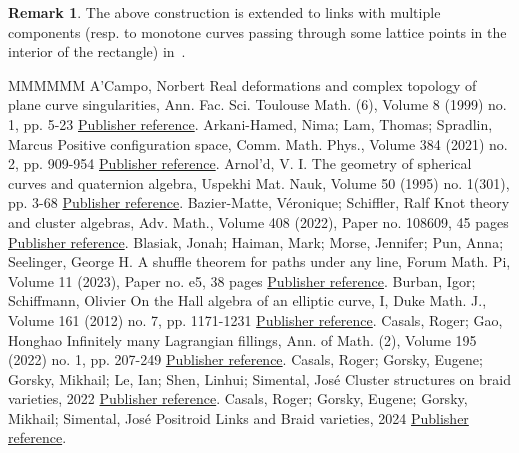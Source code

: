 \documentclass[11pt]{article}
\theoremstyle{definition}
\newtheorem{remark}[theo]{Remark}
\numberwithin{equation}{section}
\begin{document}
\begin{remark}
The above construction is extended to links with multiple components (resp. to monotone curves passing through some lattice points in the interior of the rectangle) in~\cite[Section~7.3]{GL_EHA}.
\end{remark} 


\begin{thebibliography}{MMMMMM}
 A’Campo, Norbert Real deformations and complex topology of plane curve singularities, Ann. Fac. Sci. Toulouse Math. (6), Volume 8 (1999) no. 1, pp. 5-23 \href{https://alco.centre-mersenne.org/articles/10.5802/alco.345/#ACampo}{Publisher reference}.
 Arkani-Hamed, Nima; Lam, Thomas; Spradlin, Marcus Positive configuration space, Comm. Math. Phys., Volume 384 (2021) no. 2, pp. 909-954 \href{https://alco.centre-mersenne.org/articles/10.5802/alco.345/#ALS}{Publisher reference}.
 Arnol’d, V. I. The geometry of spherical curves and quaternion algebra, Uspekhi Mat. Nauk, Volume 50 (1995) no. 1(301), pp. 3-68 \href{https://alco.centre-mersenne.org/articles/10.5802/alco.345/#Arnold}{Publisher reference}.
 Bazier-Matte, Véronique; Schiffler, Ralf Knot theory and cluster algebras, Adv. Math., Volume 408 (2022), Paper no. 108609, 45 pages \href{https://alco.centre-mersenne.org/articles/10.5802/alco.345/#BMS}{Publisher reference}.
 Blasiak, Jonah; Haiman, Mark; Morse, Jennifer; Pun, Anna; Seelinger, George H. A shuffle theorem for paths under any line, Forum Math. Pi, Volume 11 (2023), Paper no. e5, 38 pages \href{https://alco.centre-mersenne.org/articles/10.5802/alco.345/#BHMPS}{Publisher reference}.
 Burban, Igor; Schiffmann, Olivier On the Hall algebra of an elliptic curve, I, Duke Math. J., Volume 161 (2012) no. 7, pp. 1171-1231 \href{https://alco.centre-mersenne.org/articles/10.5802/alco.345/#BuSc}{Publisher reference}.
 Casals, Roger; Gao, Honghao Infinitely many Lagrangian fillings, Ann. of Math. (2), Volume 195 (2022) no. 1, pp. 207-249 \href{https://alco.centre-mersenne.org/articles/10.5802/alco.345/#CG}{Publisher reference}.
 Casals, Roger; Gorsky, Eugene; Gorsky, Mikhail; Le, Ian; Shen, Linhui; Simental, José Cluster structures on braid varieties, 2022 \href{https://alco.centre-mersenne.org/articles/10.5802/alco.345/#CGGLSS}{Publisher reference}.
 Casals, Roger; Gorsky, Eugene; Gorsky, Mikhail; Simental, José Positroid Links and Braid varieties, 2024 \href{https://alco.centre-mersenne.org/articles/10.5802/alco.345/#CGGS}{Publisher reference}.

\end{thebibliography}
\end{document}
